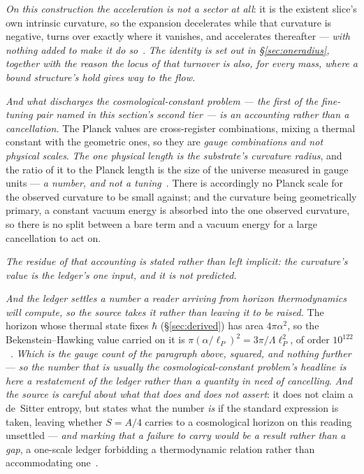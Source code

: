 \documentclass[11pt,a4paper]{article}
\theoremstyle{plain}
\theoremstyle{definition}
\begin{document}
\emph{On this construction the acceleration is not a sector at all}: it is the existent slice's own
intrinsic curvature, so the expansion decelerates while that curvature is negative, turns over exactly where
it vanishes, and accelerates thereafter --- \emph{with nothing added to make it
do so}~\cite{JanzenCRcosmology}. \emph{The identity is set out in \S\ref{sec:oneradius}, together with the
reason the locus of that turnover is also, for every mass, where a bound structure's hold gives way to the
flow.}

\emph{And what discharges the cosmological-constant problem --- the first of the fine-tuning pair named in
this section's second tier --- is an accounting rather than a cancellation.} The Planck
values are cross-register combinations, mixing a thermal constant with the geometric ones, so they are
\emph{gauge combinations and not physical scales}. \emph{The one physical length is the substrate's curvature
radius}, and the ratio of it to the Planck length is the size of the universe measured in gauge units ---
\emph{a number, and not a tuning}~\cite{JanzenGeometricCore}. There is accordingly no Planck scale for the
observed curvature to be small against; and the curvature being geometrically primary, a constant vacuum
energy is absorbed into the one observed curvature, so there is no split between a bare term and a vacuum
energy for a large cancellation to act on.

\emph{The residue of that accounting is stated rather than left implicit: the curvature's value is the
ledger's one input, and it is not predicted.}

\emph{And the ledger settles a number a reader arriving from horizon thermodynamics will compute, so the
source takes it rather than leaving it to be raised.} The horizon whose thermal state fixes $\hbar$
(\S\ref{sec:derived}) has area $4\pi\alpha^{2}$, so the Bekenstein--Hawking value carried on it is
$\pi(\alpha/\ell_{P})^{2}=3\pi/\Lambda\ell_{P}^{2}$, of order $10^{122}$~\cite{JanzenGeometricCore}.
\emph{Which is the gauge count of the paragraph above, squared, and nothing further} --- \emph{so the number
that is usually the cosmological-constant problem's headline is here a restatement of the ledger rather than
a quantity in need of cancelling}. \emph{And the source is careful about what that does and does not assert}: it does not claim a
de~Sitter entropy, but states what the number \emph{is} if the standard expression is taken, leaving whether
$S=A/4$ carries to a cosmological horizon on this reading unsettled --- \emph{and marking that a failure to
carry would be a result rather than a gap}, a one-scale ledger forbidding a thermodynamic relation rather
than accommodating one~\cite{JanzenGeometricCore}.
\end{document}
